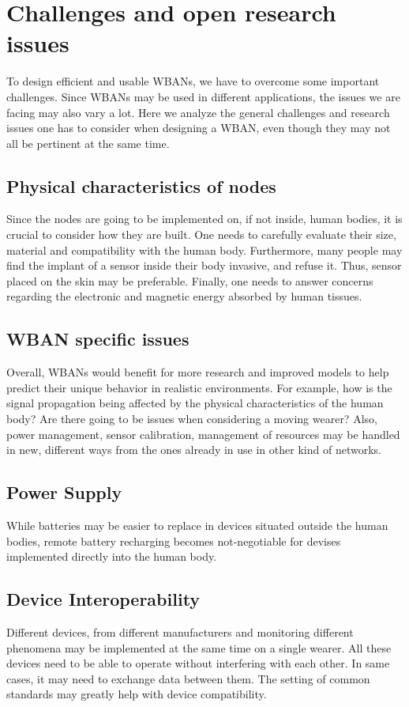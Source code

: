 \documentclass[conference]{IEEEtran}
\begin{document}
\section{Challenges and open research issues}
To design efficient and usable WBANs, we have to overcome some important challenges. Since WBANs may be used in different applications, the issues we are facing may also vary a lot. Here we analyze the general challenges and research issues one has to consider when designing a WBAN, even though they may not all be pertinent at the same time.

\subsection {Physical characteristics of nodes}
Since the nodes are going to be implemented on, if not inside, human bodies, it is crucial to consider how they are built. One needs to carefully evaluate their size, material and compatibility with the human body. Furthermore, many people may find the implant of a sensor inside their body invasive, and refuse it. Thus, sensor placed on the skin may be preferable. Finally, one needs to answer concerns regarding the electronic and magnetic energy absorbed by human tissues.

\subsection {WBAN specific issues}
Overall, WBANs would benefit for more research and improved models to help predict their unique behavior in realistic environments. For example, how is the signal propagation being affected by the physical characteristics of the human body? Are there going to be issues when considering a moving wearer? Also, power management, sensor calibration, management of resources may be handled in new, different ways from the ones already in use in other kind of networks.

\subsection {Power Supply}
While batteries may be easier to replace in devices situated outside the human bodies, remote battery recharging becomes not-negotiable for devises implemented directly into the human body.

\subsection {Device Interoperability}
Different devices, from different manufacturers and monitoring different phenomena may be implemented at the same time on a single wearer. All these devices need to be able to operate without interfering with each other. In same cases, it may need to exchange data between them. The setting of common standards may greatly help with device compatibility. 
\end{document}
